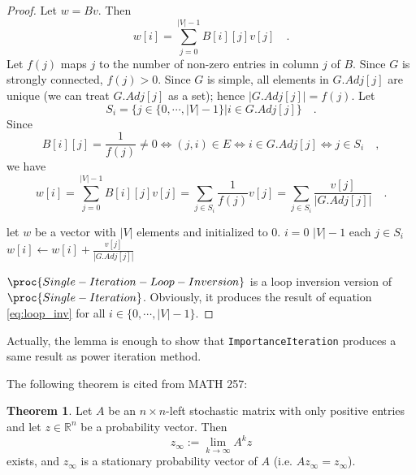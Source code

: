 \documentclass[UTF8]{ctexart}
\theoremstyle{definition}
\newtheorem{theorem}{Theorem}
\def\RR{\mathbb{R}}
\begin{document}
\begin{proof}
    Let $w = Bv$. 
    Then 
    \begin{equation*}
        w[i] = \sum\limits_{j = 0}^{| V | - 1} B[i][j] v[j]
        \quad .
    \end{equation*}
    Let $f(j)$ maps $j$ to the number of non-zero entries in column $j$ of $B$. 
    Since $G$ is strongly connected, $f(j) > 0$. 
    Since $G$ is simple, all elements in $G.Adj[j]$ are unique (we can treat $G.Adj[j]$ as a set); 
    hence $| G.Adj[j] | = f(j)$. 
    Let 
    \begin{equation*}
        S_i = \{ j \in \{ 0, \cdots, | V | - 1 \} | i \in G.Adj[j] \}
        \quad .
    \end{equation*}
    Since 
    \begin{equation*}
        B[i][j] = \frac{1}{f(j)} \neq 0 
        \Longleftrightarrow (j, i) \in E 
        \Longleftrightarrow i \in G.Adj[j]
        \Longleftrightarrow j \in S_i
        \quad ,
    \end{equation*}
    we have 
    \begin{equation} \label{eq:loop_inv}
        w[i] = \sum\limits_{j = 0}^{| V | - 1} B[i][j] v[j] 
        = \sum\limits_{j \in S_i} \frac{1}{f(j)} v[j]
        = \sum\limits_{j \in S_i} \frac{v[j]}{| G.Adj[j] |}
        \quad .
    \end{equation}

    \begin{codebox}
        \li let $w$ be a vector with $| V |$ elements and initialized to $0$. 
        \li \For $i = 0$ \To $| V | - 1$ \Do
        \li     \For each $j \in S_i$ \Do
        \li         $w[i] \gets w[i] + \frac{v[j]}{| G.Adj[j] |}$
                \End
            \End
    \end{codebox}
    $\proc{Single-Iteration-Loop-Inversion}$ is a loop inversion version of $\proc{Single-Iteration}$. 
    Obviously, it produces the result of equation \eqref{eq:loop_inv} for all $i \in \{ 0, \cdots, | V | - 1 \}$. 
\end{proof}

Actually, the lemma is enough to show that \texttt{ImportanceIteration} 
produces a same result as power iteration method. 

The following theorem is cited from MATH 257: 
\begin{theorem} \label{theorem:conv}
    Let $A$ be an $n \times n$-left stochastic matrix with only positive entries 
    and let $z \in \RR^n$ be a probability vector. 
    Then 
    \begin{equation*}
        z_{\infty} := \lim\limits_{k \rightarrow \infty} A^k z
    \end{equation*}
    exists, and $z_{\infty}$ is a stationary probability vector of $A$ 
    (i.e. $A z_{\infty} = z_{\infty}$). 
\end{theorem}
\end{document}
